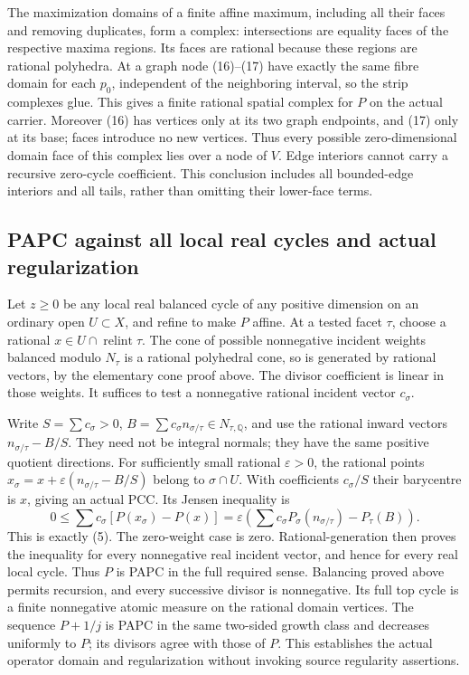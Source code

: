 \documentclass[
  11pt,
]{article}
\begin{document}
The maximization domains of a finite affine maximum, including all their
faces and removing duplicates, form a complex: intersections are
equality faces of the respective maxima regions. Its faces are rational
because these regions are rational polyhedra. At a graph node (16)--(17)
have exactly the same fibre domain for each \(p_0\), independent of the
neighboring interval, so the strip complexes glue. This gives a finite
rational spatial complex for \(P\) on the actual carrier. Moreover (16)
has vertices only at its two graph endpoints, and (17) only at its base;
faces introduce no new vertices. Thus every possible zero-dimensional
domain face of this complex lies over a node of \(V\). Edge interiors
cannot carry a recursive zero-cycle coefficient. This conclusion
includes all bounded-edge interiors and all tails, rather than omitting
their lower-face terms.

\subsection{PAPC against all local real cycles and actual
regularization}\label{papc-against-all-local-real-cycles-and-actual-regularization}

Let \(z\geq0\) be any local real balanced cycle of any positive
dimension on an ordinary open \(U\subset X\), and refine to make \(P\)
affine. At a tested facet \(\tau\), choose a rational
\(x\in U\cap\operatorname{relint}\tau\). The cone of possible
nonnegative incident weights balanced modulo \(N_\tau\) is a rational
polyhedral cone, so is generated by rational vectors, by the elementary
cone proof above. The divisor coefficient is linear in those weights. It
suffices to test a nonnegative rational incident vector \(c_\sigma\).

Write \(S=\sum c_\sigma>0\),
\(B=\sum c_\sigma n_{\sigma/\tau}\in N_{\tau,\mathbb Q}\), and use the
rational inward vectors \(n_{\sigma/\tau}-B/S\). They need not be
integral normals; they have the same positive quotient directions. For
sufficiently small rational \(\varepsilon>0\), the rational points
\(x_\sigma=x+\varepsilon(n_{\sigma/\tau}-B/S)\) belong to
\(\sigma\cap U\). With coefficients \(c_\sigma/S\) their barycentre is
\(x\), giving an actual PCC. Its Jensen inequality is \[
 0\leq\sum c_\sigma[P(x_\sigma)-P(x)]
       =\varepsilon\left(\sum c_\sigma P_\sigma(n_{\sigma/\tau})-P_\tau(B)\right).
\] This is exactly (5). The zero-weight case is zero.
Rational-generation then proves the inequality for every nonnegative
real incident vector, and hence for every real local cycle. Thus \(P\)
is PAPC in the full required sense. Balancing proved above permits
recursion, and every successive divisor is nonnegative. Its full top
cycle is a finite nonnegative atomic measure on the rational domain
vertices. The sequence \(P+1/j\) is PAPC in the same two-sided growth
class and decreases uniformly to \(P\); its divisors agree with those of
\(P\). This establishes the actual operator domain and regularization
without invoking source regularity assertions.
\end{document}
